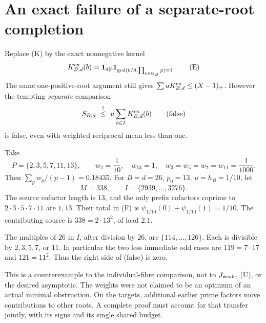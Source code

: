\documentclass[11pt,a4paper]{article}
\newcommand{\pos}[1]{(#1)_+}
\newcommand{\ind}{\mathbf{1}}
\begin{document}
\section{An exact failure of a separate-root completion}
Replace (K) by the exact nonnegative kernel
\[
 K^{\rm ex}_{B,d}(b)
 =\ind_{d\mid b}
   \ind_{\gcd(b/d,\prod_{p\in Q_B}p)=1}.
 \tag{E}
\]
The same one-positive-root argument still gives
\(\sum uK^{\rm ex}_{B,d}\le\pos{X-1}\).
However the tempting \emph{separate} comparison
\[
 S_{B,d}\ \stackrel{?}{\le}\
 u\sum_{b\in I}K^{\rm ex}_{B,d}(b)
 \tag{false}
\]
is false, even with weighted reciprocal mean less than one.

Take
\[
 P=\{2,3,5,7,11,13\},\qquad
 w_2=\frac1{10},\quad w_{13}=1,\quad
 w_3=w_5=w_7=w_{11}=\frac1{1000}.
\]
Then \(\sum_pw_p/(p-1)=0.18435\).
For \(B=d=26\), \(p_0=13\), \(u=h_B=1/10\), let
\[
 M=338,\qquad I=\{2939,\ldots,3276\}.
\]
The source cofactor length is \(13\), and the only prefix cofactors
coprime to \(2\cdot3\cdot5\cdot7\cdot11\) are \(1,13\).
Their total in (F) is \(\psi_{1/10}(0)+\psi_{1/10}(1)=1/10\).
The contributing source is \(338=2\cdot13^2\), of load \(2.1\).

The multiples of \(26\) in \(I\), after division by \(26\), are
\(\{114,\ldots,126\}\). Each is divisible by \(2,3,5,7\), or \(11\).
In particular the two less immediate odd cases are
\(119=7\cdot17\) and \(121=11^2\).
Thus the right side of (false) is zero.

This is a counterexample to the individual-fibre comparison, not
to \(J_{\rm weak}\), (U), or the desired asymptotic. The weights
were not claimed to be an optimum of an actual minimal obstruction.
On the targets, additional earlier prime factors move contributions
to other roots. A complete proof must account for that transfer
jointly, with its signs and its single shared budget.
\end{document}
